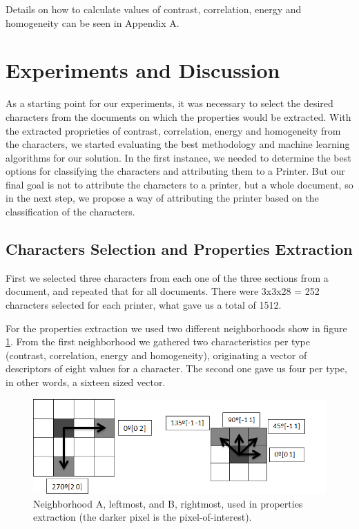 \documentclass[10pt,twocolumn,letterpaper]{article}
\begin{document}
Details on how to calculate values of contrast, correlation, energy and homogeneity can be seen in Appendix A.

\section{Experiments and Discussion}
\label{sec:experiments}

As a starting point for our experiments, it was necessary to select the desired characters from the documents on which the properties would be extracted. With the extracted proprieties of contrast, correlation, energy and homogeneity from the characters, we started evaluating the best methodology and machine learning algorithms for our solution. In the first instance, we needed to determine the best options for classifying the characters and attributing them to a Printer. But our final goal is not to attribute the characters to a printer, but a whole document, so in the next step, we propose a way of attributing the printer based on the classification of the characters.

\subsection{Characters Selection and Properties Extraction}

First we selected three characters from each one of the three sections from a document, and repeated that for all documents. There were 3x3x28 = 252 characters selected for each printer, what gave us a total of 1512.

For the properties extraction we used two different neighborhoods show in figure \ref{fig:neighbor}. From the first neighborhood we gathered two characteristics per type (contrast, correlation, energy and homogeneity), originating a vector of descriptors of eight values for a character. The second one gave us four per type, in other words, a sixteen sized vector.

\begin{figure}
\begin{center}
	\includegraphics[width=0.99\columnwidth]{neighbor}
	\caption{Neighborhood A, leftmost, and B, rightmost, used in properties extraction (the darker pixel is the pixel-of-interest).}
\label{fig:neighbor}   
\end{center} 
\end{figure}
\end{document}
